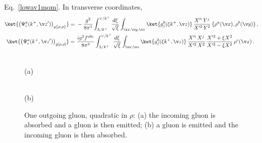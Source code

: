 Eq.~\eqref{lowav1mom}. In transverse coordinates,
\begin{align}\label{gtworhoX}
\ket{\big(\Psi^{a}_{i}(k^{+},\v z')\big)_{g\{\rho,\rho\}}}
=\ &-\frac{g^{2}}{8\pi^{3}}\int_{\Lambda/k^{+}}^{\vee/k^{+}}\frac{d\xi}{\sqrt{\xi}}\int_{\v x,\v y,\v z}
\ket{g^{b}_{j}(\xi k^{+},\v z)}\,\frac{X'^{i}\,Y^{j}}{X'^{2}\,Y^{2}}\,\{\rho^{a}(\v x),\rho^{b}(\v y)\}\,,\\
\ket{\big(\Psi^{a}_{i}(k^{+},\v z')\big)_{g[\rho,\rho]}}
=\ &\frac{ig^{2}f^{abc}}{8\pi^{3}}\int_{\Lambda/k^{+}}^{\vee/k^{+}}\frac{d\xi}{\sqrt{\xi}}\int_{\v x,\v z}
\ket{g^{b}_{j}(\xi k^{+},\v z)}\,\frac{X'^{i}\,X^{j}}{X'^{2}\,X^{2}}\,\frac{X'^{2}+\xi X^{2}}{X'^{2}-\xi X^{2}}\,\rho^{c}(\v x)\,.
\label{gtworhoX2}
\end{align}

\begin{figure}[t]
\centering
\begin{minipage}[b]{0.45\textwidth}\centering{}\\[2pt](a)\end{minipage}\hfill
\begin{minipage}[b]{0.45\textwidth}\centering{}\\[2pt](b)\end{minipage}
\caption{One outgoing gluon, quadratic in $\rho$: (a) the incoming gluon is absorbed and a gluon is then
emitted; (b) a gluon is emitted and the incoming gluon is then absorbed.}
\label{fig:onegrhorho}
\end{figure}

